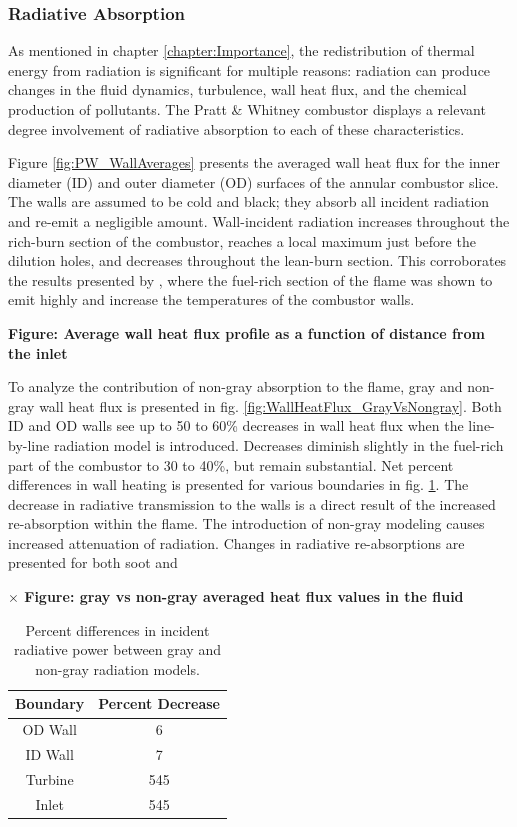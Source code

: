 \subsubsection{Radiative Absorption}
As mentioned in chapter \ref{chapter:Importance}, the redistribution of thermal energy from radiation is significant for multiple reasons: radiation can produce changes in the fluid dynamics, turbulence, wall heat flux, and the chemical production of pollutants.
The Pratt \& Whitney combustor displays a relevant degree involvement of radiative absorption to each of these characteristics.

Figure \ref{fig:PW_WallAverages} presents the averaged wall heat flux for the inner diameter (ID) and outer diameter (OD) surfaces of the annular combustor slice. 
The walls are assumed to be cold and black; they absorb all incident radiation and re-emit a negligible amount. 
Wall-incident radiation increases throughout the rich-burn section of the combustor, reaches a local maximum just before the dilution holes, and decreases throughout the lean-burn section.
This corroborates the results presented by \citet{Gamil2020AssessmentChamber}, where the fuel-rich section of the flame was shown to emit highly and increase the temperatures of the combustor walls.

\textbf{\checkmark Figure: Average wall heat flux profile as a function of distance from the inlet}

To analyze the contribution of non-gray absorption to the flame, gray and non-gray wall heat flux is presented in fig. \ref{fig:WallHeatFlux_GrayVsNongray}.
Both ID and OD walls see up to 50 to 60\% decreases in wall heat flux when the line-by-line radiation model is introduced. Decreases diminish slightly in the fuel-rich part of the combustor to 30 to 40\%, but remain substantial.
Net percent differences in wall heating is presented for various boundaries in fig. \ref{table:PW_GrayVsNonGray}.
The decrease in radiative transmission to the walls is a direct result of the increased re-absorption within the flame. 
The introduction of non-gray modeling causes increased attenuation of radiation. Changes in radiative re-absorptions are presented for both soot and 


\textbf{$\times$ Figure: gray vs non-gray averaged heat flux values in the fluid}

\begin{table}[h!]
\centering
\begin{tabular}{||c c||} 
 \hline
 Boundary & Percent Decrease \\ [0.5ex] 
 \hline\hline
 OD Wall & 6 \\ 
 ID Wall & 7  \\
 Turbine & 545  \\
 Inlet & 545  \\ [1ex] 
 \hline
\end{tabular}
\caption{Percent differences in incident radiative power between gray and non-gray radiation models.}
\label{table:PW_GrayVsNonGray}
\end{table}

